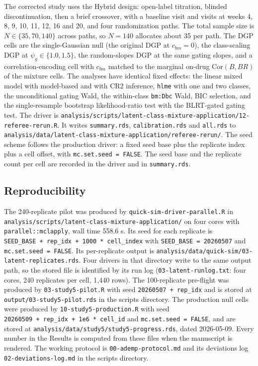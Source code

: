 \documentclass[
  11pt,
]{article}
\begin{document}
The corrected study uses the Hybrid design: open-label titration,
blinded discontinuation, then a brief crossover, with a baseline visit
and visits at weeks 4, 8, 9, 10, 11, 12, 16 and 20, and four
randomization paths. The total sample size is \(N \in \{35, 70, 140\}\)
across paths, so \(N = 140\) allocates about 35 per path. The DGP cells
are the single-Gaussian null (the original DGP at \(c_{bm} = 0\)), the
class-scaling DGP at \(\psi_g \in \{1.0, 1.5\}\), the random-slopes DGP
at the same gating slopes, and a correlation-encoding cell with
\(c_{bm}\) matched to the marginal on-drug \(\mathrm{Cor}(B, BR)\) of the
mixture cells. The analyses have identical fixed effects: the linear
mixed model with model-based and with CR2 inference, \texttt{hlme} with one
and two classes, the unconditional gating Wald, the within-class
\texttt{bm:Dbc} Wald, BIC selection, and the single-resample bootstrap
likelihood-ratio test with the BLRT-gated gating test. The driver is
\texttt{analysis/scripts/latent-class-mixture-application/12-referee-rerun.R}.
It writes \texttt{summary.rds}, \texttt{calibration.rds} and \texttt{all.rds} to
\texttt{analysis/data/latent-class-mixture-application/referee-rerun/}. The
seed scheme follows the production driver: a fixed seed base plus the
replicate index plus a cell offset, with \texttt{mc.set.seed\ =\ FALSE}. The
seed base and the replicate count per cell are recorded in the driver
and in \texttt{summary.rds}.

\subsection{Reproducibility}\label{reproducibility}

The 240-replicate pilot was produced by \texttt{quick-sim-driver-parallel.R}
in \texttt{analysis/scripts/latent-class-mixture-application/} on four cores
with \texttt{parallel::mclapply}, wall time 558.6 s. Its seed for each
replicate is \texttt{SEED\_BASE\ +\ rep\_idx\ +\ 1000\ *\ cell\_index} with
\texttt{SEED\_BASE\ =\ 20260507} and \texttt{mc.set.seed\ =\ FALSE}. Its per-replicate
output is \texttt{analysis/data/quick-sim/03-latent-replicates.rds}. Four
drivers in that directory write to the same output path, so the
stored file is identified by its run log
(\texttt{03-latent-runlog.txt}: four cores, 240 replicates per cell, 1,440
rows). The 100-replicate pre-flight was produced by
\texttt{03-study5-pilot.R} with seed \texttt{20260507\ +\ rep\_idx} and is stored at
\texttt{output/03-study5-pilot.rds} in the scripts directory. The production
null cells were produced by \texttt{10-study5-production.R} with seed
\texttt{20260509\ +\ rep\_idx\ +\ 1e6\ *\ cell\_id} and \texttt{mc.set.seed\ =\ FALSE}, and
are stored at \texttt{analysis/data/study5/study5-progress.rds}, dated
2026-05-09. Every number in the Results is computed from these
files when the manuscript is rendered. The working protocol is
\texttt{00-ademp-protocol.md} and its deviations log \texttt{02-deviations-log.md}
in the scripts directory.
\end{document}
